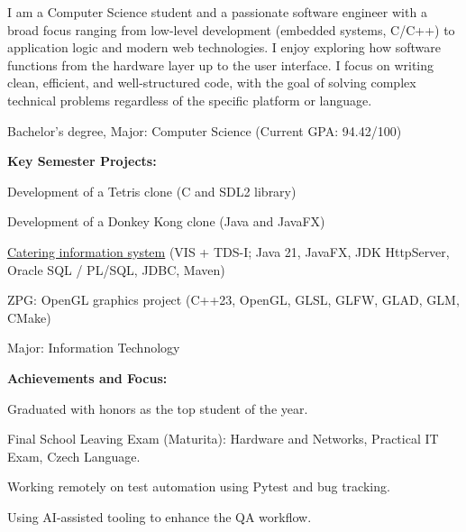 \documentclass[10pt,a4paper]{article}
\begin{document}

I am a Computer Science student and a passionate software engineer with a broad focus ranging from low-level development (embedded systems, C/C++) to application logic and modern web technologies. I enjoy exploring how software functions from the hardware layer up to the user interface. I focus on writing clean, efficient, and well-structured code, with the goal of solving complex technical problems regardless of the specific platform or language.

\hspace*{7pt}Bachelor’s degree, Major: Computer Science (Current GPA: 94.42/100)
\begin{cvedu}
  \item \textbf{Key Semester Projects:}
  \begin{cvsub}
    \item Development of a Tetris clone (C and SDL2 library)
    \item Development of a Donkey Kong clone (Java and JavaFX)
    \item \href{https://github.com/JaZafier00716/catering_project}{Catering information system} (VIS + TDS-I; Java 21, JavaFX, JDK HttpServer, Oracle SQL / PL/SQL, JDBC, Maven)
    \item ZPG: OpenGL graphics project (C++23, OpenGL, GLSL, GLFW, GLAD, GLM, CMake)
  \end{cvsub}
\end{cvedu}

\hspace*{7pt}Major: Information Technology
\begin{cvedu}
  \item \textbf{Achievements and Focus:}
  \begin{cvsub}
    \item Graduated with honors as the top student of the year.
    \item Final School Leaving Exam (Maturita): Hardware and Networks, Practical IT Exam, Czech Language.
  \end{cvsub}
\end{cvedu}

\begin{cvlist}
  \item Working remotely on test automation using Pytest and bug tracking.
  \item Using AI-assisted tooling to enhance the QA workflow.
\end{cvlist}
\end{document}
